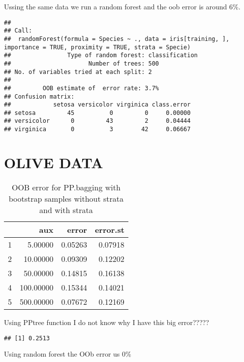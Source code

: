 \documentclass{article}
\begin{document}
Ussing the same data we run a random forest and the oob error is around 6\%.
\begin{knitrout}
\color{fgcolor}\begin{kframe}
\begin{verbatim}
## 
## Call:
##  randomForest(formula = Species ~ ., data = iris[training, ],      importance = TRUE, proximity = TRUE, strata = Specie) 
##                Type of random forest: classification
##                      Number of trees: 500
## No. of variables tried at each split: 2
## 
##         OOB estimate of  error rate: 3.7%
## Confusion matrix:
##            setosa versicolor virginica class.error
## setosa         45          0         0     0.00000
## versicolor      0         43         2     0.04444
## virginica       0          3        42     0.06667
\end{verbatim}
\end{kframe}
\end{knitrout}



  
\newpage

\section{OLIVE DATA}



\begin{table}[ht]
\centering
\caption{OOB error for PP.bagging with bootstrap samples without strata and with strata} 
\begin{tabular}{rrrr}
  \hline
 & aux & error & error.st \\ 
  \hline
1 & 5.00000 & 0.05263 & 0.07918 \\ 
  2 & 10.00000 & 0.09309 & 0.12202 \\ 
  3 & 50.00000 & 0.14815 & 0.16138 \\ 
  4 & 100.00000 & 0.15344 & 0.14021 \\ 
  5 & 500.00000 & 0.07672 & 0.12169 \\ 
   \hline
\end{tabular}
\end{table}


Using PPtree function I do not know why I have this big error?????
\begin{knitrout}
\color{fgcolor}\begin{kframe}
\begin{verbatim}
## [1] 0.2513
\end{verbatim}
\end{kframe}
\end{knitrout}
Using random forest the OOb error us 0\%
\end{document}
